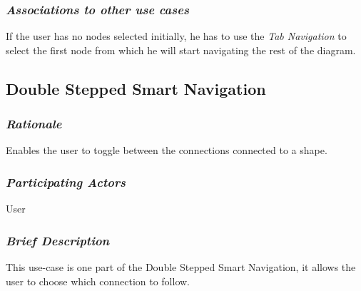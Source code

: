 \subsubsection {\em Associations to other use cases}
\par \noindent
If the user has no nodes selected initially, he has to use the {\em Tab Navigation} to select the first node from which he will start navigating the rest of the diagram.

\subsection{Double Stepped Smart Navigation}

\subsubsection {\em Rationale}
Enables the user to toggle between the connections connected to a shape.

\subsubsection {\em Participating Actors}
User

\subsubsection {\em Brief Description}
This use-case is one part of the {\rm Double Stepped Smart Navigation}, it allows the user to choose which connection to follow.

